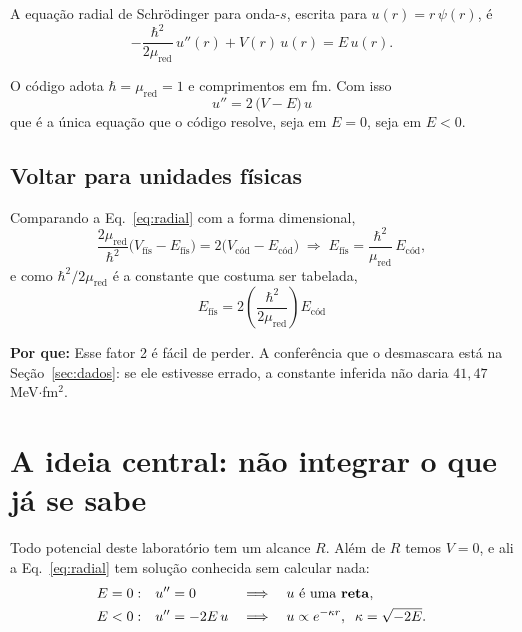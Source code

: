 \documentclass[11pt,a4paper]{article}
\newcommand{\pq}[1]{\medskip\noindent\textbf{Por que:} #1\medskip}
\begin{document}
A equação radial de Schrödinger para onda-$s$, escrita para $u(r) = r\,\psi(r)$, é
\begin{equation}
  -\frac{\hbar^2}{2\mu_{\text{red}}}\,u''(r) + V(r)\,u(r) = E\,u(r).
\end{equation}

O código adota $\hbar = \mu_{\text{red}} = 1$ e comprimentos em fm. Com isso
\begin{equation}
  \boxed{\;u'' = 2\,\bigl(V - E\bigr)\,u\;}
  \label{eq:radial}
\end{equation}
que é a única equação que o código resolve, seja em $E=0$, seja em $E<0$.

\subsection*{Voltar para unidades físicas}

Comparando a Eq.~\eqref{eq:radial} com a forma dimensional,
\[
  \frac{2\mu_{\text{red}}}{\hbar^2}\bigl(V_{\text{fís}} - E_{\text{fís}}\bigr)
  = 2\bigl(V_{\text{cód}} - E_{\text{cód}}\bigr)
  \;\Longrightarrow\;
  E_{\text{fís}} = \frac{\hbar^2}{\mu_{\text{red}}}\,E_{\text{cód}},
\]
e como $\hbar^2/2\mu_{\text{red}}$ é a constante que costuma ser tabelada,
\begin{equation}
  \boxed{\;E_{\text{fís}} = 2\left(\frac{\hbar^2}{2\mu_{\text{red}}}\right) E_{\text{cód}}\;}
  \label{eq:conversao}
\end{equation}

\pq{Esse fator 2 é fácil de perder. A conferência que o desmascara está na
Seção~\ref{sec:dados}: se ele estivesse errado, a constante inferida não daria
$41{,}47$ MeV$\cdot$fm$^2$.}

\section{A ideia central: não integrar o que já se sabe}
\label{sec:ideia}

Todo potencial deste laboratório tem um alcance $R$. Além de $R$ temos $V = 0$,
e ali a Eq.~\eqref{eq:radial} tem solução conhecida sem calcular nada:
\begin{align}
  E = 0:&\quad u'' = 0 &&\Longrightarrow\quad u \text{ é uma \textbf{reta}},\\
  E < 0:&\quad u'' = -2E\,u &&\Longrightarrow\quad u \propto e^{-\kappa r},\;\;
    \kappa = \sqrt{-2E}.
\end{align}
\end{document}
